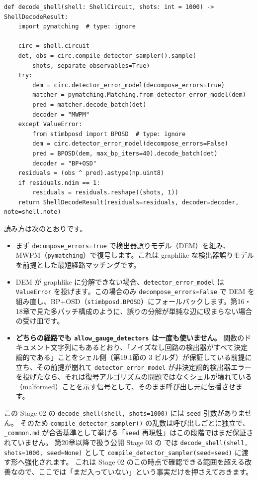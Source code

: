 \begin{lstlisting}[caption={decode\_shell（src/stages/02\_circuit\_level/src/ftqc/ls\_handoff\_shells.py）}]
def decode_shell(shell: ShellCircuit, shots: int = 1000) -> ShellDecodeResult:
    import pymatching  # type: ignore

    circ = shell.circuit
    det, obs = circ.compile_detector_sampler().sample(
        shots, separate_observables=True)
    try:
        dem = circ.detector_error_model(decompose_errors=True)
        matcher = pymatching.Matching.from_detector_error_model(dem)
        pred = matcher.decode_batch(det)
        decoder = "MWPM"
    except ValueError:
        from stimbposd import BPOSD  # type: ignore
        dem = circ.detector_error_model(decompose_errors=False)
        pred = BPOSD(dem, max_bp_iters=40).decode_batch(det)
        decoder = "BP+OSD"
    residuals = (obs ^ pred).astype(np.uint8)
    if residuals.ndim == 1:
        residuals = residuals.reshape((shots, 1))
    return ShellDecodeResult(residuals=residuals, decoder=decoder, note=shell.note)
\end{lstlisting}

読み方は次のとおりです。

\begin{itemize}
  \item まず \texttt{decompose\_errors=True} で検出器誤りモデル（DEM）を組み、MWPM（\texttt{pymatching}）で復号します。これは graphlike な検出器誤りモデルを前提とした最短経路マッチングです。
  \item DEM が graphlike に分解できない場合、\texttt{detector\_error\_model} は \texttt{ValueError} を投げます。この場合のみ \texttt{decompose\_errors=False} で DEM を組み直し、BP+OSD（\texttt{stimbposd.BPOSD}）にフォールバックします。第16・18章で見た多パッチ構成のように、誤りの分解が単純な辺に収まらない場合の受け皿です。
  \item \textbf{どちらの経路でも \texttt{allow\_gauge\_detectors} は一度も使いません。} 関数のドキュメント文字列にもあるとおり、「ノイズなし回路の検出器がすべて決定論的である」ことをシェル側（第19.1節の 3 ビルダ）が保証している前提に立ち、その前提が崩れて \texttt{detector\_error\_model} が非決定論的検出器エラーを投げたなら、それは復号アルゴリズムの問題ではなくシェルが壊れている（malformed）ことを示す信号として、そのまま呼び出し元に伝播させます。
\end{itemize}

\begin{notebox}
  この Stage 02 の \texttt{decode\_shell(shell, shots=1000)} には \texttt{seed} 引数がありません。
  そのため \texttt{compile\_detector\_sampler()} の乱数は呼び出しごとに独立で、\texttt{\_common.md} が合否基準として挙げる「\texttt{seed} 再現性」はこの段階ではまだ保証されていません。
  第20章以降で扱う公開 Stage 03 の  では \texttt{decode\_shell(shell, shots=1000, seed=None)} として \texttt{compile\_detector\_sampler(seed=seed)} に渡す形へ強化されます。
  これは Stage 02 のこの時点で確認できる範囲を超える改善なので、ここでは「まだ入っていない」という事実だけを押さえておきます。
\end{notebox}

